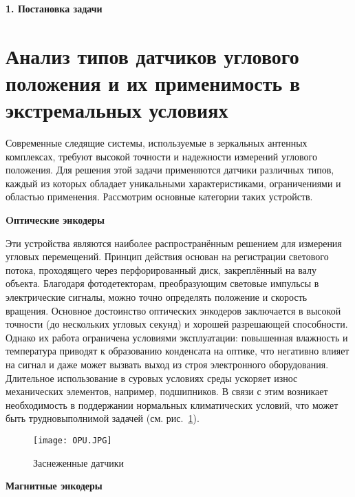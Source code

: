 \newpage
\begin{center}
  \textbf{\large 1. Постановка задачи}
\end{center}


\section{Анализ типов датчиков углового положения и их применимость в экстремальных условиях}

Современные следящие системы, используемые в зеркальных антенных комплексах, требуют высокой точности и надежности измерений углового положения. 
Для решения этой задачи применяются датчики различных типов, каждый из которых обладает уникальными характеристиками, ограничениями и областью применения. 
Рассмотрим основные категории таких устройств.

\textbf{Oптические энкодеры} 
  
   Эти устройства являются наиболее распространённым решением для измерения угловых перемещений. Принцип действия основан на регистрации светового потока, проходящего через перфорированный диск, 
  закреплённый на валу объекта. Благодаря фотодетекторам, преобразующим световые импульсы в электрические сигналы, можно точно определять положение и скорость вращения.
   Основное достоинство оптических энкодеров заключается в высокой точности (до нескольких угловых секунд) и хорошей разрешающей способности. 
   Однако их работа ограничена условиями эксплуатации: повышенная влажность и температура приводят к образованию конденсата на оптике, 
   что негативно влияет на сигнал и даже может вызвать выход из строя электронного оборудования. 
   Длительное использование в суровых условиях среды ускоряет износ механических элементов, например, подшипников. В связи с этим возникает необходимость в поддержании нормальных климатических условий,
   что может быть трудновыполнимой задачей (см. рис.~\ref{OpuInSnow}). 

  \begin{figure}[!t]
    \centering
    \texttt{[image: OPU.JPG]}
    \caption{Заснеженные датчики}
    \label{OpuInSnow}
  \end{figure}

  \newpage
  \textbf{Магнитные энкодеры}
  
